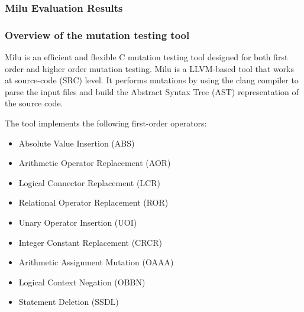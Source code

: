 
\subsubsection{Milu Evaluation Results}
\label{subsec:milu}

\subsubsection{Overview of the mutation testing tool}

Milu is an efficient and flexible C mutation testing tool designed for both first order and higher order mutation testing. Milu is a LLVM-based tool that works at source-code (SRC) level. It performs mutations by using the clang compiler to parse the input files and build the Abstract Syntax Tree (AST) representation of the source code.

The tool implements the following first-order operators:
\begin{itemize}
	\item Absolute Value Insertion (ABS)
	\item Arithmetic Operator Replacement (AOR)
	\item Logical Connector Replacement (LCR)
	\item Relational Operator Replacement (ROR)
	\item Unary Operator Insertion (UOI)
	\item Integer Constant Replacement (CRCR)
	\item Arithmetic Assignment Mutation (OAAA)
	\item Logical Context Negation (OBBN)
	\item Statement Deletion (SSDL)
\end{itemize}


